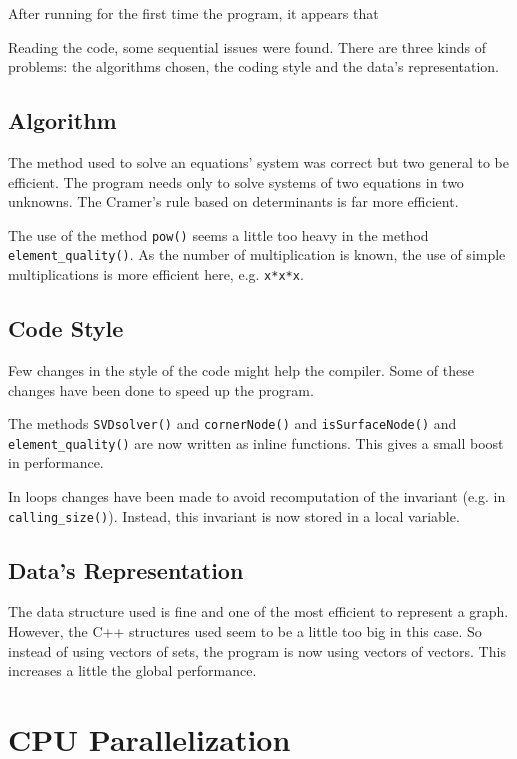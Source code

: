 \documentclass[fleqn,10pt]{SelfArx} %
\begin{document}
After running for the first time the program, it appears that 

Reading the code, some sequential issues were found. There are three kinds of problems: the algorithms chosen, the coding style and the data's representation.

\subsection{Algorithm}

The method used to solve an equations' system was correct but two general to be efficient. The program needs only to solve systems of two equations in two unknowns. The Cramer's rule based on determinants is far more efficient.

The use of the method \verb+pow()+ seems a little too heavy in the method \verb+element_quality()+. As the number of multiplication is known, the use of simple multiplications is more efficient here, e.g. \verb+x*x*x+.

\subsection{Code Style}

Few changes in the style of the code might help the compiler. Some of these changes have been done to speed up the program.

The methods \verb+SVDsolver()+ and \verb+cornerNode()+ and \verb+isSurfaceNode()+ and \verb+element_quality()+ are now written as inline functions. This gives a small boost in performance.

In loops changes have been made to avoid recomputation of the invariant (e.g. in \verb+calling_size()+). Instead, this invariant is now stored in a local variable.

\subsection{Data's Representation}

The data structure used is fine and one of the most efficient to represent a graph. However, the C++ structures used seem to be a little too big in this case. So instead of using vectors of sets, the program is now using vectors of vectors. This increases a little the global performance.

\section{CPU Parallelization}
\end{document}
